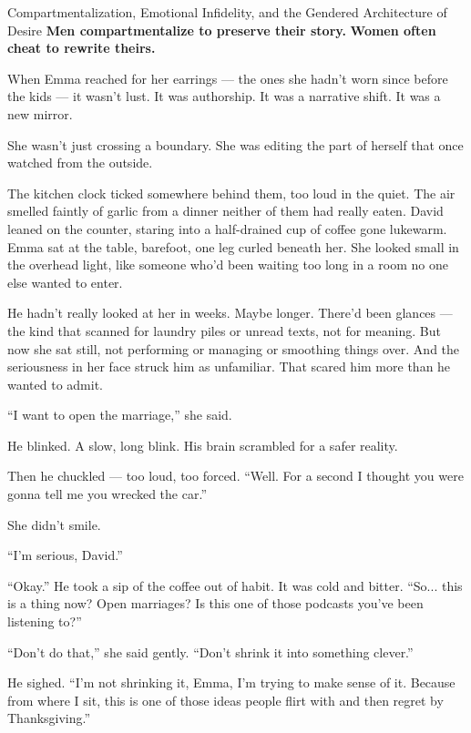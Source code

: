 \begin{PsychologicalSidebar}{Compartmentalization, Emotional Infidelity, and the Gendered Architecture of Desire}
  \textbf{Men compartmentalize to preserve their story.}  
  \textbf{Women often cheat to rewrite theirs.}  

  \medskip
  
  When Emma reached for her earrings --- the ones she hadn’t worn since before the kids --- it wasn’t lust.  
  It was authorship.  
  It was a narrative shift.  
  It was a new mirror.
  
  \medskip
  
  She wasn’t just crossing a boundary.  
  She was editing the part of herself that once watched from the outside.
  
\end{PsychologicalSidebar}

\medskip

The kitchen clock ticked somewhere behind them, too loud in the quiet. The air smelled faintly of garlic from a dinner neither of them had really eaten. David leaned on the counter, staring into a half-drained cup of coffee gone lukewarm. Emma sat at the table, barefoot, one leg curled beneath her. She looked small in the overhead light, like someone who’d been waiting too long in a room no one else wanted to enter.

He hadn’t really looked at her in weeks. Maybe longer. There’d been glances — the kind that scanned for laundry piles or unread texts, not for meaning. But now she sat still, not performing or managing or smoothing things over. And the seriousness in her face struck him as unfamiliar. That scared him more than he wanted to admit.

“I want to open the marriage,” she said.

He blinked. A slow, long blink. His brain scrambled for a safer reality.

Then he chuckled — too loud, too forced. “Well. For a second I thought you were gonna tell me you wrecked the car.”

She didn’t smile.

“I’m serious, David.”

“Okay.” He took a sip of the coffee out of habit. It was cold and bitter. “So... this is a thing now? Open marriages? Is this one of those podcasts you’ve been listening to?”

“Don’t do that,” she said gently. “Don’t shrink it into something clever.”

He sighed. “I’m not shrinking it, Emma, I’m trying to make sense of it. Because from where I sit, this is one of those ideas people flirt with and then regret by Thanksgiving.”

